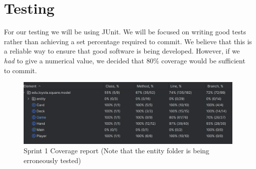 \section{Testing}

For our testing we will be using JUnit. We will be focused on writing good tests rather than achieving a set percentage required to commit. We believe that this is a reliable way to ensure that good software is being developed. However, if we \textit{had} to give a numerical value, we decided that 80\% coverage would be sufficient to commit.

\begin{figure}[!hbt]
    \centering
    \includegraphics[width=1.0\linewidth]{figures/Coverage report (Model).png}
    \caption{Sprint 1 Coverage report (Note that the entity folder is being erroneously tested)}
    \label{Coverage report}
\end{figure}


